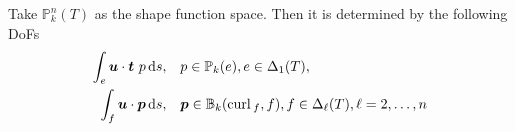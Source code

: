 \documentclass[mathpazo]{cicp}
\begin{document}
\begin{theorem}\label{thm:NedelecTNdecomp}
Take $\mathbb P_k^n(T)$ as the shape function space.
Then it is determined by the following DoFs
\begin{subequations}\label{eq:dofNedelec}
\begin{align}
\label{eq:dofvectoredgecurl}
\int_e \boldsymbol u\cdot \boldsymbol t\ p \,{\rm d} s,& \quad p\in \mathbb P_{k} (e), e\in \Delta_1(T),\\
\label{eq:dofvectorfacecurl}
\int_f \boldsymbol u\cdot \boldsymbol p \,{\rm d} s,& \quad \boldsymbol p\in \mathbb B_k({\rm curl\,}_f, f),f\in\Delta_{\ell}(T), \ell=2,\ldots, n
\end{align}
\end{subequations}
\end{theorem}
\end{document}
